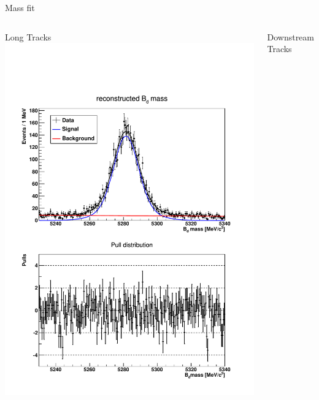 \documentclass{beamer}
\begin{document}
	\begin{frame}{Mass fit}
	\begin{columns}
	\begin{block}{Long Tracks}
	\includegraphics[width=\textwidth]{mass_fit_lt}
	\end{block}
	\begin{block}{Downstream Tracks}

\end{block}
\end{columns}
\end{frame}
\end{document}
